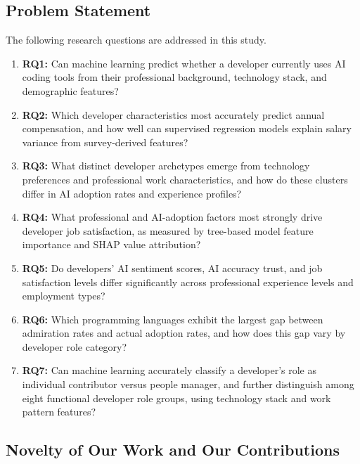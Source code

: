 \documentclass[journal, onecolumn]{IEEEtran}
\begin{document}
\subsection{Problem Statement}
The following research questions are addressed in this study.
\begin{enumerate}
    \item \textbf{RQ1:} Can machine learning predict whether a developer currently uses AI coding tools from their professional background, technology stack, and demographic features?
    \item \textbf{RQ2:} Which developer characteristics most accurately predict annual compensation, and how well can supervised regression models explain salary variance from survey-derived features?
    \item \textbf{RQ3:} What distinct developer archetypes emerge from technology preferences and professional work characteristics, and how do these clusters differ in AI adoption rates and experience profiles?
    \item \textbf{RQ4:} What professional and AI-adoption factors most strongly drive developer job satisfaction, as measured by tree-based model feature importance and SHAP value attribution?
    \item \textbf{RQ5:} Do developers' AI sentiment scores, AI accuracy trust, and job satisfaction levels differ significantly across professional experience levels and employment types?
    \item \textbf{RQ6:} Which programming languages exhibit the largest gap between admiration rates and actual adoption rates, and how does this gap vary by developer role category?
    \item \textbf{RQ7:} Can machine learning accurately classify a developer's role as individual contributor versus people manager, and further distinguish among eight functional developer role groups, using technology stack and work pattern features?
\end{enumerate}

\subsection{Novelty of Our Work and Our Contributions}
\end{document}
